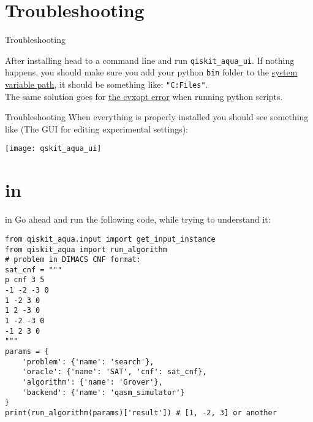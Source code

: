 \documentclass[aspectratio=43]{beamer}
\begin{document}
\section{Troubleshooting \qka}
\begin{frame}{Troubleshooting \qka}
    \begin{card}
        After installing head to a command line and run  \texttt{qiskit_aqua_ui}. If nothing happens, you should make sure you add your python \texttt{bin} folder to the \href{https://docs.alfresco.com/4.2/tasks/fot-addpath.html}{system variable path}, it should be something like: \texttt{"C:\Program Files\Library\bin"}.\\
        The same solution goes for \href{https://stackoverflow.com/questions/14778178/import-cvxopt-base-the-specified-module-could-not-be-found}{the cvxopt error} when running python scripts.
    \end{card}
\pagenumber
\end{frame}

\begin{frame}{Troubleshooting \qka}
    \small{When everything is properly installed you should see something like (The \qka GUI for editing experimental settings):}
    \begin{center}
        \texttt{[image: qskit\_aqua\_ui]}
    \end{center}
\pagenumber
\end{frame}

\section{\gvsa in \qka}
\begin{frame}[fragile]{\gvsa in \qka}
Go ahead and run the following code, while trying to understand it:\begin{verbatim}
from qiskit_aqua.input import get_input_instance
from qiskit_aqua import run_algorithm
# problem in DIMACS CNF format:
sat_cnf = """
p cnf 3 5
-1 -2 -3 0
1 -2 3 0
1 2 -3 0
1 -2 -3 0
-1 2 3 0
"""
params = {
    'problem': {'name': 'search'},
    'oracle': {'name': 'SAT', 'cnf': sat_cnf},
    'algorithm': {'name': 'Grover'},
    'backend': {'name': 'qasm_simulator'}
}
print(run_algorithm(params)['result']) # [1, -2, 3] or another
\end{verbatim}
\end{frame}
\end{document}
